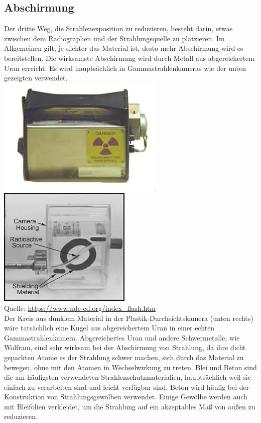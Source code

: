 \subsection{Abschirmung}
Der dritte Weg, die Strahlenexposition zu reduzieren, besteht darin, etwas zwischen dem Radiographen und der Strahlungsquelle zu platzieren. Im Allgemeinen gilt, je dichter das Material ist, desto mehr Abschirmung wird es bereitstellen. Die wirksamste Abschirmung wird durch Metall aus abgereichertem Uran erreicht. Es wird hauptsächlich in Gammastrahlenkameras wie der unten gezeigten verwendet.\\
\includegraphics[scale=0.9]{img/cameraoutside.jpg}\\ 
 \includegraphics[scale=0.5]{img/camera_pigtail.jpg}\\
 Quelle: \url{https://www.nde-ed.org/index_flash.htm}\\
Der Kreis aus dunklem Material in der Plastik-Durchsichtskamera (unten rechts) wäre tatsächlich eine Kugel aus abgereichertem Uran in einer echten Gammastrahlenkamera. Abgereichertes Uran und andere Schwermetalle, wie Wolfram, sind sehr wirksam bei der Abschirmung von Strahlung, da ihre dicht gepackten Atome es der Strahlung schwer machen, sich durch das Material zu bewegen, ohne mit den Atomen in Wechselwirkung zu treten. Blei und Beton sind die am häufigsten verwendeten Strahlenschutzmaterialien, hauptsächlich weil sie einfach zu verarbeiten sind und leicht verfügbar sind. Beton wird häufig bei der Konstruktion von Strahlungsgewölben verwendet. Einige Gewölbe werden auch mit Bleifolien verkleidet, um die Strahlung auf ein akzeptables Maß von außen zu reduzieren.

